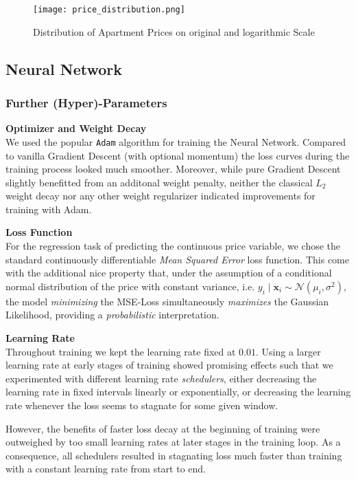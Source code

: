 \begin{figure}[ht]
  \centering
  \texttt{[image: price\_distribution.png]}
  \caption{Distribution of Apartment Prices on original and logarithmic Scale}
  \label{fig:price-distribution}
\end{figure}


\subsection{Neural Network}

\subsubsection{Further (Hyper)-Parameters} \label{appendix:hyperparameters}

\textbf{Optimizer and Weight Decay} \\
We used the popular \texttt{Adam} algorithm \citep{kingma2017} for training the Neural Network.
Compared to vanilla Gradient Descent (with optional momentum) the loss curves during the training process looked much smoother.
Moreover, while pure Gradient Descent slightly benefitted from an additonal weight penalty, neither the classical $L_2$ weight decay nor any other weight regularizer indicated improvements for training with Adam.

\textbf{Loss Function} \\
For the regression task of predicting the continuous price variable, we chose the standard continuously differentiable \emph{Mean Squared Error} loss function.
This come with the additional nice property that, under the assumption of a conditional normal distribution of the price with constant variance, i.e. $y_i \mid \mathbf{x}_i \sim \mathcal{N} \left(\mu_i, \sigma^2 \right)$, the model \emph{minimizing} the MSE-Loss simultaneously \emph{maximizes} the Gaussian Likelihood, providing a \emph{probabilistic} interpretation.

\textbf{Learning Rate} \\
Throughout training we kept the learning rate fixed at $0.01$.
Using a larger learning rate at early stages of training showed promising effects such that we experimented with different learning rate \emph{schedulers}, either decreasing the learning rate in fixed intervals linearly or exponentially, or decreasing the learning rate whenever the loss seems to stagnate for some given window.

However, the benefits of faster loss decay at the beginning of training were outweighed by too small learning rates at later stages in the training loop.
As a consequence, all schedulers resulted in stagnating loss much faster than training with a constant learning rate from start to end.

